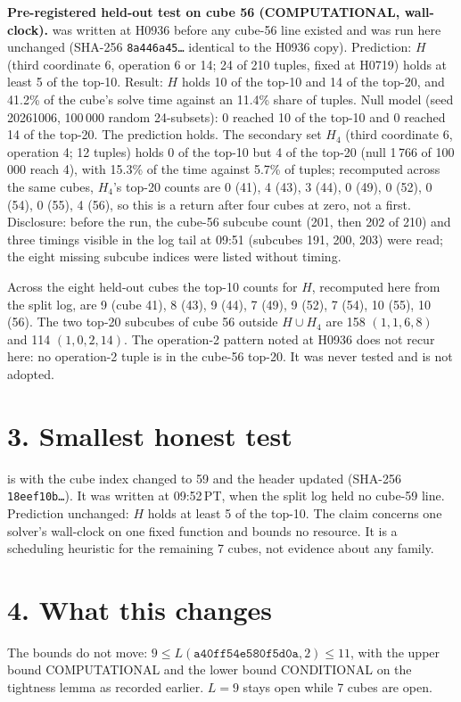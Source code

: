 \documentclass[11pt]{article}
\begin{document}
\textbf{Pre-registered held-out test on cube 56 (COMPUTATIONAL, wall-clock).}  was written at H0936 before any cube-56 line existed and was run here unchanged (SHA-256 \texttt{8a446a45\ldots} identical to the H0936 copy). Prediction: $H$ (third coordinate 6, operation 6 or 14; 24 of 210 tuples, fixed at H0719) holds at least 5 of the top-10. Result: $H$ holds 10 of the top-10 and 14 of the top-20, and 41.2\% of the cube's solve time against an 11.4\% share of tuples. Null model (seed 20261006, 100\,000 random 24-subsets): 0 reached 10 of the top-10 and 0 reached 14 of the top-20. The prediction holds. The secondary set $H_4$ (third coordinate 6, operation 4; 12 tuples) holds 0 of the top-10 but 4 of the top-20 (null 1\,766 of 100\,000 reach 4), with 15.3\% of the time against 5.7\% of tuples; recomputed across the same cubes, $H_4$'s top-20 counts are 0 (41), 4 (43), 3 (44), 0 (49), 0 (52), 0 (54), 0 (55), 4 (56), so this is a return after four cubes at zero, not a first. Disclosure: before the run, the cube-56 subcube count (201, then 202 of 210) and three timings visible in the log tail at 09:51 (subcubes 191, 200, 203) were read; the eight missing subcube indices were listed without timing.

Across the eight held-out cubes the top-10 counts for $H$, recomputed here from the split log, are 9 (cube 41), 8 (43), 9 (44), 7 (49), 9 (52), 7 (54), 10 (55), 10 (56). The two top-20 subcubes of cube 56 outside $H\cup H_4$ are 158 $(1,1,6,8)$ and 114 $(1,0,2,14)$. The operation-2 pattern noted at H0936 does not recur here: no operation-2 tuple is in the cube-56 top-20. It was never tested and is not adopted.

\section*{3. Smallest honest test}
 is  with the cube index changed to 59 and the header updated (SHA-256 \texttt{18eef10b\ldots}). It was written at 09:52\,PT, when the split log held no cube-59 line. Prediction unchanged: $H$ holds at least 5 of the top-10. The claim concerns one solver's wall-clock on one fixed function and bounds no resource. It is a scheduling heuristic for the remaining 7 cubes, not evidence about any family.

\section*{4. What this changes}
The bounds do not move: $9\le L(\texttt{a40ff54e580f5d0a},2)\le 11$, with the upper bound COMPUTATIONAL and the lower bound CONDITIONAL on the tightness lemma as recorded earlier. $L=9$ stays open while 7 cubes are open.
\end{document}
